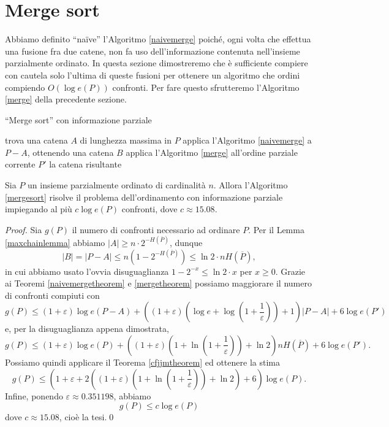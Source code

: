 \section{Merge sort} Abbiamo definito ``na\"ive'' l'Algoritmo \ref{naivemerge} poiché, ogni volta che effettua una fusione fra due catene, non fa uso dell'informazione contenuta nell'insieme parzialmente ordinato. In questa sezione dimostreremo che è sufficiente compiere con cautela solo l'ultima di queste fusioni per ottenere un algoritmo che ordini compiendo \(O(\log{e(P)})\) confronti. Per fare questo sfrutteremo l'Algoritmo \ref{merge} della precedente sezione. 
\begin{algorithm}
  \caption{``Merge sort'' con informazione parziale} \label{mergesort} 
  \begin{algorithmic}
    [1] \STATE trova una catena \(A\) di lunghezza massima in \(P\) \STATE applica l'Algoritmo \ref{naivemerge} a \(P-A\), ottenendo una catena \(B\) \STATE applica l'Algoritmo \ref{merge} all'ordine parziale corrente \(P'\) \RETURN la catena risultante 
  \end{algorithmic}
\end{algorithm}
\begin{theorem}
  \label{mergesorttheorem} Sia \(P\) un insieme parzialmente ordinato di cardinalità \(n\). Allora l'Algoritmo \ref{mergesort} risolve il problema dell'ordinamento con informazione parziale impiegando al più \(c \log{e(P)}\) confronti, dove \(c\approx 15.08\). 
\end{theorem}
\begin{proof}
  Sia \(g(P)\) il numero di confronti necessario ad ordinare \(P\). Per il Lemma \ref{maxchainlemma} abbiamo \(|A|\ge n\cdot 2^{-H(\overline{P})}\), dunque
  \[|B|=|P-A|\le n\left(1-2^{-H(\overline{P})}\right)\le\ln{2}\cdot nH(\overline{P}),\]
  in cui abbiamo usato l'ovvia disuguaglianza \(1-2^{-x}\le\ln{2}\cdot x\) per \(x\ge 0\). Grazie ai Teoremi \ref{naivemergetheorem} e \ref{mergetheorem} possiamo maggiorare il numero di confronti compiuti con
  \[g(P)\le(1+\varepsilon)\log{e(P-A)}+\left((1+\varepsilon)\left(\log{e}+\log{\left(1+\frac{1}{\varepsilon}\right)}\right)+1\right)|P-A|+6\log{e(P')}\]
  e, per la disuguaglianza appena dimostrata,
  \[ g(P)\le(1+\varepsilon)\log{e(P)}+\left((1+\varepsilon)\left(1+\ln{\left(1+\frac{1}{\varepsilon}\right)}\right)+\ln{2}\right)nH(\overline{P})+6\log{e(P')}.\]
  Possiamo quindi applicare il Teorema \ref{cfjjmtheorem} ed ottenere la stima
  \[g(P)\le\left(1+\varepsilon+2\left((1+\varepsilon)\left(1+\ln{\left(1+\frac{1}{\varepsilon}\right)}\right)+\ln{2}\right)+6\right)\log{e(P)}.\]
  Infine, ponendo \(\varepsilon\approx 0.351198\), abbiamo
  \[g(P)\le c\log{e(P)}\nonumber\]
  dove \(c\approx 15.08\), cioè la tesi.\qed 
\end{proof}
